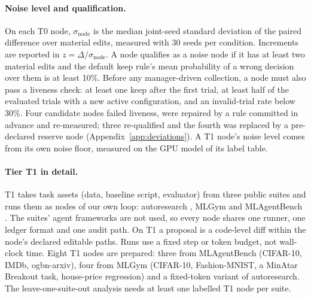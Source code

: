 \paragraph{Noise level and qualification.}
On each T0 node, $\sigma_{\mathrm{node}}$ is the median joint-seed standard deviation of the paired difference over material edits, measured with 30 seeds per condition. Increments are reported in $z=\Delta/\sigma_{\mathrm{node}}$. A node qualifies as a noise node if it has at least two material edits and the default keep rule's mean probability of a wrong decision over them is at least 10\%. Before any manager-driven collection, a node must also pass a liveness check: at least one keep after the first trial, at least half of the evaluated trials with a new active configuration, and an invalid-trial rate below 30\%. Four candidate nodes failed liveness, were repaired by a rule committed in advance and re-measured; three re-qualified and the fourth was replaced by a pre-declared reserve node (Appendix~\ref{app:deviations}). A T1 node's noise level comes from its own noise floor, measured on the GPU model of its label table. \NoiseFloorTable{} 

\paragraph{Tier T1 in detail.}
T1 takes task assets (data, baseline script, evaluator) from three public suites and runs them as nodes of our own loop: autoresearch \citep{autoresearchloop}, MLGym \citep{mlgym2025} and MLAgentBench \citep{mlagentbench}. The suites' agent frameworks are not used, so every node shares one runner, one ledger format and one audit path. On T1 a proposal is a code-level diff within the node's declared editable paths. Runs use a fixed step or token budget, not wall-clock time. Eight T1 nodes are prepared: three from MLAgentBench (CIFAR-10, IMDb, ogbn-arxiv), four from MLGym (CIFAR-10, Fashion-MNIST, a MinAtar Breakout task, house-price regression) and a fixed-token variant of autoresearch. The leave-one-suite-out analysis needs at least one labelled T1 node per suite.

